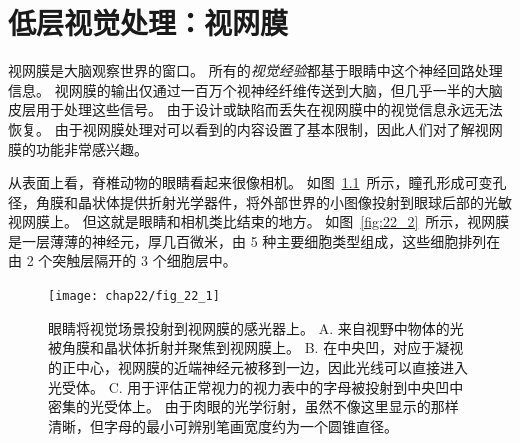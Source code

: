 \chapter{低层视觉处理：视网膜} \label{chap:chap22}

视网膜是大脑观察世界的窗口。
所有的\textit{视觉经验}都基于眼睛中这个神经回路处理信息。
视网膜的输出仅通过一百万个视神经纤维传送到大脑，但几乎一半的大脑皮层用于处理这些信号。
由于设计或缺陷而丢失在视网膜中的视觉信息永远无法恢复。
由于视网膜处理对可以看到的内容设置了基本限制，因此人们对了解视网膜的功能非常感兴趣。


从表面上看，脊椎动物的眼睛看起来很像相机。
如图~\ref{fig:22_1}~所示，瞳孔形成可变孔径，角膜和晶状体提供折射光学器件，将外部世界的小图像投射到眼球后部的光敏视网膜上。
但这就是眼睛和相机类比结束的地方。
如图~\ref{fig:22_2}~所示，视网膜是一层薄薄的神经元，厚几百微米，由 5 种主要细胞类型组成，这些细胞排列在由 2 个突触层隔开的 3 个细胞层中。


\begin{figure}[htbp]
	\centering
	\texttt{[image: chap22/fig\_22\_1]}
	\caption{眼睛将视觉场景投射到视网膜的感光器上。
		A. 来自视野中物体的光被角膜和晶状体折射并聚焦到视网膜上。
		B. 在中央凹，对应于凝视的正中心，视网膜的近端神经元被移到一边，因此光线可以直接进入光受体。
		C. 用于评估正常视力的视力表中的字母被投射到中央凹中密集的光受体上。
		由于肉眼的光学衍射，虽然不像这里显示的那样清晰，但字母的最小可辨别笔画宽度约为一个圆锥直径\cite{curcio1991organization}。}
	\label{fig:22_1}
\end{figure}


